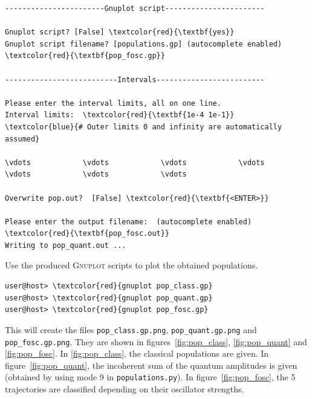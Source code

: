 \documentclass[a4paper,11pt,DIV=15,openany]{scrbook}
\newcommand{\ttt}[1]{\texttt{#1}}
\begin{document}
\begin{oframed}
\begin{Verbatim}[commandchars=\\\{\}]
-----------------------Gnuplot script-----------------------

Gnuplot script? [False] \textcolor{red}{\textbf{yes}}
Gnuplot script filename? [populations.gp] (autocomplete enabled) \textcolor{red}{\textbf{pop_fosc.gp}}

--------------------------Intervals-------------------------

Please enter the interval limits, all on one line.
Interval limits:  \textcolor{red}{\textbf{1e-4 1e-1}}          \textcolor{blue}{# Outer limits 0 and infinity are automatically assumed}

\vdots            \vdots            \vdots            \vdots            \vdots            \vdots            \vdots            

Overwrite pop.out?  [False] \textcolor{red}{\textbf{<ENTER>}}

Please enter the output filename:  (autocomplete enabled) \textcolor{red}{\textbf{pop_fosc.out}}
Writing to pop_quant.out ...
\end{Verbatim}
\end{oframed}

\normalsize
Use the produced \textsc{Gnuplot} scripts to plot the obtained populations.
\begin{Verbatim}[commandchars=\\\{\}]
user@host> \textcolor{red}{gnuplot pop_class.gp}
user@host> \textcolor{red}{gnuplot pop_quant.gp}
user@host> \textcolor{red}{gnuplot pop_fosc.gp}
\end{Verbatim}

This will create the files \ttt{pop\_class.gp.png}, \ttt{pop\_quant.gp.png} and \ttt{pop\_fosc.gp.png}. They are shown in figures~\ref{fig:pop_class}, \ref{fig:pop_quant} and \ref{fig:pop_fosc}. In \ref{fig:pop_class}, the classical populations are given. In figure~\ref{fig:pop_quant}, the incoherent sum of the quantum amplitudes is given (obtained by using mode 9 in \ttt{populations.py}). In figure~\ref{fig:pop_fosc}, the 5 trajectories are classified depending on their oscillator strengths.
\end{document}
